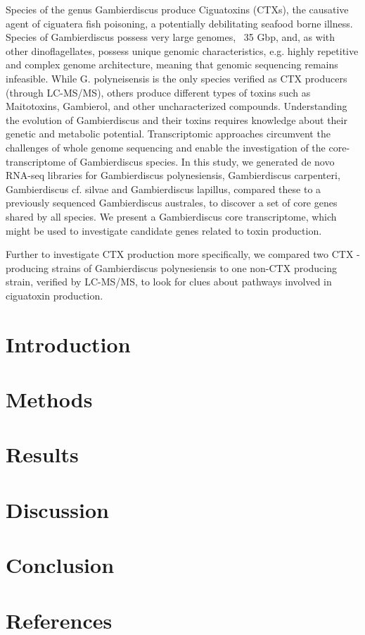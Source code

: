 \documentclass[12pt]{article}
\begin{document}
Species of the genus Gambierdiscus produce Ciguatoxins (CTXs), the causative agent of ciguatera fish poisoning, a potentially debilitating seafood borne illness. Species of Gambierdiscus possess very large genomes, ~35 Gbp, and, as with other dinoflagellates, possess unique genomic characteristics, e.g. highly repetitive and complex genome architecture, meaning that genomic sequencing remains infeasible. While G. polyneisensis is the only species verified as CTX producers (through LC-MS/MS), others produce different types of toxins such as Maitotoxins, Gambierol, and other uncharacterized compounds. Understanding the evolution of Gambierdiscus and their toxins requires knowledge about their genetic and metabolic potential. Transcriptomic approaches circumvent the challenges of whole genome sequencing and enable the investigation of the core-transcriptome of Gambierdiscus species. In this study, we generated de novo RNA-seq libraries for  Gambierdiscus polynesiensis, Gambierdiscus carpenteri, Gambierdiscus cf. silvae and Gambierdiscus lapillus, compared these to a previously sequenced Gambierdiscus australes, to discover a set of core genes shared by all species. We present a Gambierdiscus core transcriptome, which might be used to investigate candidate genes related to toxin production.

Further to investigate CTX production more specifically, we compared two CTX -producing strains of Gambierdiscus polynesiensis to one non-CTX producing strain, verified by LC-MS/MS, to look for clues about pathways involved in ciguatoxin production.

\newpage
\section*{Introduction}

\newpage
\section*{Methods}

\newpage
\section*{Results}

\newpage
\section*{Discussion}

\newpage
\section*{Conclusion}

\newpage
\section*{References}

\newpage


\end{document}
